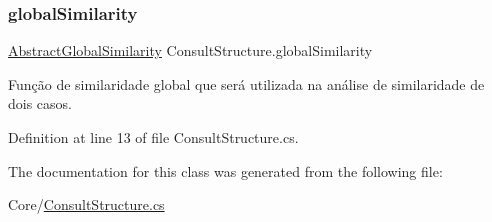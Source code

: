 \hypertarget{class_consult_structure_a337fe1e0d78aeb5e773f0bbeb5c9f5cc}{}\label{class_consult_structure_a337fe1e0d78aeb5e773f0bbeb5c9f5cc} 
\subsubsection{\texorpdfstring{global\+Similarity}{globalSimilarity}}
{\footnotesize\ttfamily \hyperlink{class_abstract_global_similarity}{Abstract\+Global\+Similarity} Consult\+Structure.\+global\+Similarity}



Função de similaridade global que será utilizada na análise de similaridade de dois casos. 



Definition at line 13 of file Consult\+Structure.\+cs.



The documentation for this class was generated from the following file\+:\begin{DoxyCompactItemize}
\item 
Core/\hyperlink{_consult_structure_8cs}{Consult\+Structure.\+cs}\end{DoxyCompactItemize}
